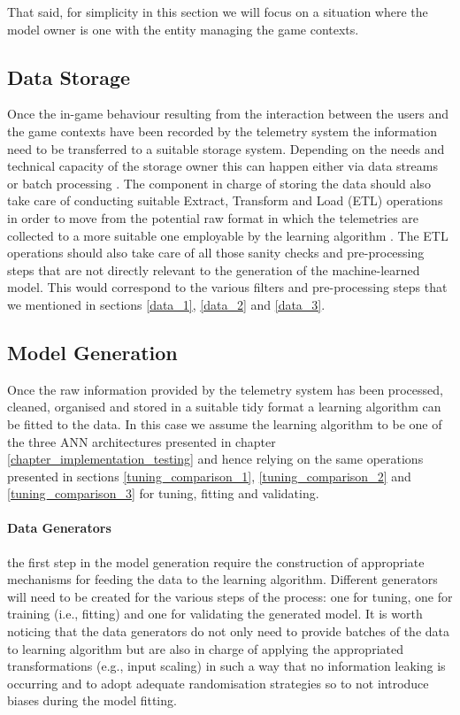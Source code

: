That said, for simplicity in this section we will focus on a situation where the model owner is one with the entity managing the game contexts.

\subsection{Data Storage}
Once the in-game behaviour resulting from the interaction between the users and the game contexts have been recorded by the telemetry system the information need to be transferred to a suitable storage system. Depending on the needs and technical capacity of the storage owner this can happen either via data streams or batch processing \cite{el2016game}. The component in charge of storing the data should also take care of conducting suitable Extract, Transform and Load (ETL) operations in order to move from the potential raw format in which the telemetries are collected to a more suitable one employable by the learning algorithm \cite{el2016game}. The ETL operations should also take care of all those sanity checks and pre-processing steps that are not directly relevant to the generation of the machine-learned model. This would correspond to the various filters and pre-processing steps that we mentioned in sections \ref{data_1}, \ref{data_2} and \ref{data_3}.

\subsection{Model Generation}
Once the raw information provided by the telemetry system has been processed, cleaned, organised and stored in a suitable tidy format a learning algorithm can be fitted to the data. In this case we assume the learning algorithm to be one of the three ANN architectures presented in chapter \ref{chapter_implementation_testing} and hence relying on the same operations presented in sections \ref{tuning_comparison_1}, \ref{tuning_comparison_2} and \ref{tuning_comparison_3} for tuning, fitting and validating.

\paragraph*{Data Generators} the first step in the model generation require the construction of appropriate mechanisms for feeding the data to the learning algorithm. Different generators will need to be created for the various steps of the process: one for tuning, one for training (i.e., fitting) and one for validating the generated model. It is worth noticing that the data generators do not only need to provide batches of the data to learning algorithm but are also in charge of applying the appropriated transformations (e.g., input scaling) in such a way that no information leaking is occurring and to adopt adequate randomisation strategies so to not introduce biases during the model fitting.

